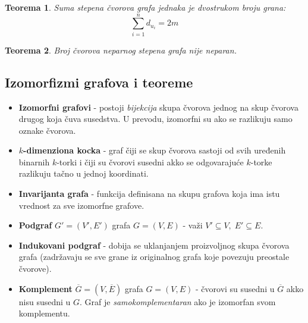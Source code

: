 \documentclass[a4paper,12pt,twoside]{report}
\newtheorem{theorem}{Teorema}[section]
\numberwithin{algorithm}{section}
\begin{document}
\begin{theorem}
    Suma stepena čvorova grafa jednaka je dvostrukom broju grana:
    $$\sum_{i = 1}^{n} d_{u_i} = 2m$$
\end{theorem}

\begin{theorem}
    Broj čvorova \textit{neparnog stepena} grafa nije neparan.
\end{theorem}

\subsection{Izomorfizmi grafova i teoreme}
\begin{itemize}
    \item \textbf{Izomorfni grafovi} - postoji \textit{bijekcija} skupa čvorova jednog na skup čvorova drugog koja čuva susedstva. U prevodu, izomorfni su ako se razlikuju samo oznake čvorova.
    \item \textbf{$k$-dimenziona kocka} - graf čiji se skup čvorova sastoji od svih uređenih binarnih $k$-torki i čiji su čvorovi susedni akko se odgovarajuće $k$-torke razlikuju tačno u jednoj koordinati.
    \item \textbf{Invarijanta grafa} - funkcija definisana na skupu grafova koja ima istu vrednost za sve izomorfne grafove.
    \item \textbf{Podgraf} $G' = (V', E')$ grafa $G = (V, E)$ - važi $V' \subseteq V, \; E' \subseteq E$.
    \item \textbf{Indukovani podgraf} - dobija se uklanjanjem proizvoljnog skupa čvorova grafa (zadržavaju se sve grane iz originalnog grafa koje povezuju preostale čvorove).
    \item \textbf{Komplement} $\overline{G} = (V, \overline{E})$ grafa $G = (V, E)$ - čvorovi su susedni u $\overline{G}$ akko nisu susedni u $G$. Graf je \textit{samokomplementaran} ako je izomorfan svom komplementu.
\end{itemize}
\end{document}
